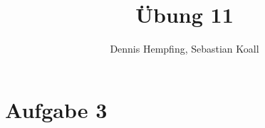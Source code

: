 \documentclass[12pt]{scrartcl}%
\theoremstyle{nonumberplain}
\begin{document}
\author{Dennis Hempfing, Sebastian Koall}
\title{Übung 11}
\date{} 
\pagestyle{myheadings}

\maketitle %

\section*{Aufgabe 3}
\end{document}
